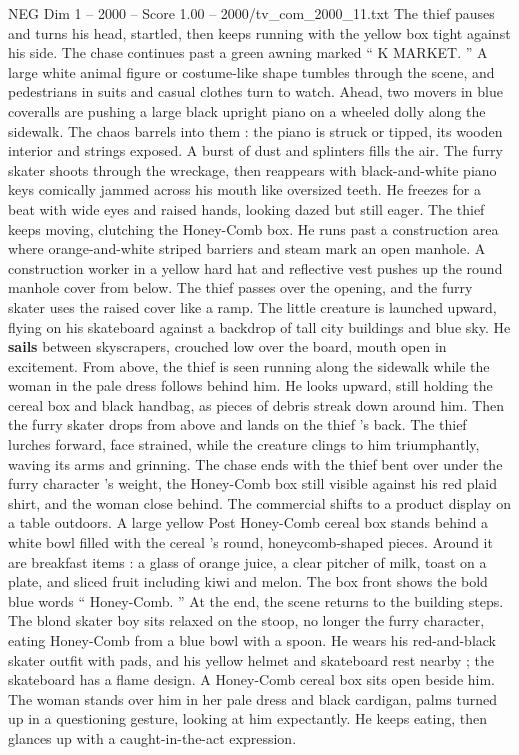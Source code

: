 \begin{textsample}{NEG Dim 1 – 2000 – Score 1.00 – 2000/tv\_com\_2000\_11.txt}
The thief pauses and turns his head, startled, then keeps running with the yellow box tight against his side.
The chase continues past a green awning marked “ K MARKET. ” A large white animal figure or costume-like shape tumbles through the scene, and pedestrians in suits and casual clothes turn to watch.
Ahead, two movers in blue coveralls are pushing a large black upright piano on a wheeled dolly along the sidewalk.
The chaos barrels into them : the piano is struck or tipped, its wooden interior and strings exposed.
A burst of dust and splinters fills the air.
The furry skater shoots through the wreckage, then reappears with black-and-white piano keys comically jammed across his mouth like oversized teeth.
He freezes for a beat with wide eyes and raised hands, looking dazed but still eager.
The thief keeps moving, clutching the Honey-Comb box.
He runs past a construction area where orange-and-white striped barriers and steam mark an open manhole.
A construction worker in a yellow hard hat and reflective vest pushes up the round manhole cover from below.
The thief passes over the opening, and the furry skater uses the raised cover like a ramp.
The little creature is launched upward, flying on his skateboard against a backdrop of tall city buildings and blue sky.
He \textbf{sails} between skyscrapers, crouched low over the board, mouth open in excitement.
From above, the thief is seen running along the sidewalk while the woman in the pale dress follows behind him.
He looks upward, still holding the cereal box and black handbag, as pieces of debris streak down around him.
Then the furry skater drops from above and lands on the thief ’s back.
The thief lurches forward, face strained, while the creature clings to him triumphantly, waving its arms and grinning.
The chase ends with the thief bent over under the furry character ’s weight, the Honey-Comb box still visible against his red plaid shirt, and the woman close behind.
The commercial shifts to a product display on a table outdoors.
A large yellow Post Honey-Comb cereal box stands behind a white bowl filled with the cereal ’s round, honeycomb-shaped pieces.
Around it are breakfast items : a glass of orange juice, a clear pitcher of milk, toast on a plate, and sliced fruit including kiwi and melon.
The box front shows the bold blue words “ Honey-Comb. ” At the end, the scene returns to the building steps.
The blond skater boy sits relaxed on the stoop, no longer the furry character, eating Honey-Comb from a blue bowl with a spoon.
He wears his red-and-black skater outfit with pads, and his yellow helmet and skateboard rest nearby ; the skateboard has a flame design.
A Honey-Comb cereal box sits open beside him.
The woman stands over him in her pale dress and black cardigan, palms turned up in a questioning gesture, looking at him expectantly.
He keeps eating, then glances up with a caught-in-the-act expression.

\end{textsample}
